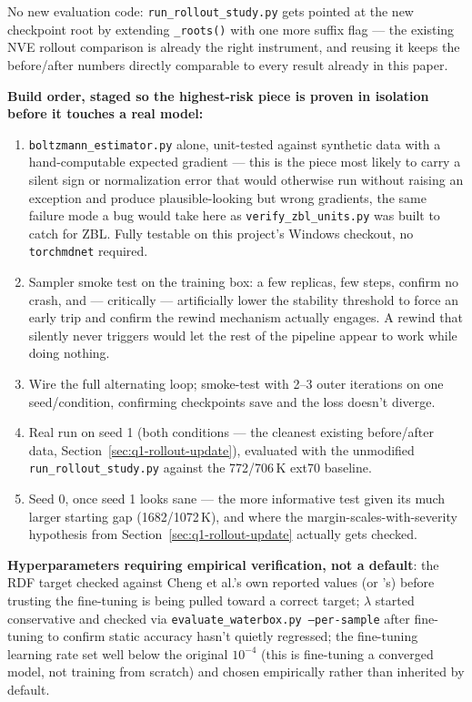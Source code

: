\documentclass[11pt]{article}
\begin{document}
No new evaluation code: \texttt{run\_rollout\_study.py} gets pointed at the
new checkpoint root by extending \texttt{\_roots()} with one more suffix
flag --- the existing NVE rollout comparison is already the right
instrument, and reusing it keeps the before/after numbers directly
comparable to every result already in this paper.

\textbf{Build order, staged so the highest-risk piece is proven in
isolation before it touches a real model:}
\begin{enumerate}
  \item \texttt{boltzmann\_estimator.py} alone, unit-tested against
  synthetic data with a hand-computable expected gradient --- this is the
  piece most likely to carry a silent sign or normalization error that
  would otherwise run without raising an exception and produce
  plausible-looking but wrong gradients, the same failure mode a bug would
  take here as \texttt{verify\_zbl\_units.py} was built to catch for ZBL.
  Fully testable on this project's Windows checkout, no \texttt{torchmdnet}
  required.
  \item Sampler smoke test on the training box: a few replicas, few steps,
  confirm no crash, and --- critically --- artificially lower the
  stability threshold to force an early trip and confirm the rewind
  mechanism actually engages. A rewind that silently never triggers would
  let the rest of the pipeline appear to work while doing nothing.
  \item Wire the full alternating loop; smoke-test with 2--3 outer
  iterations on one seed/condition, confirming checkpoints save and the
  loss doesn't diverge.
  \item Real run on seed 1 (both conditions --- the cleanest existing
  before/after data, Section~\ref{sec:q1-rollout-update}), evaluated with
  the unmodified \texttt{run\_rollout\_study.py} against the 772/706\,K
  ext70 baseline.
  \item Seed 0, once seed 1 looks sane --- the more informative test given
  its much larger starting gap (1682/1072\,K), and where the
  margin-scales-with-severity hypothesis from
  Section~\ref{sec:q1-rollout-update} actually gets checked.
\end{enumerate}

\textbf{Hyperparameters requiring empirical verification, not a default}:
the RDF target checked against Cheng et al.'s own reported values (or
\citet{thaler2021difftre}'s) before trusting the fine-tuning is being
pulled toward a correct target; $\lambda$ started conservative and checked
via \texttt{evaluate\_waterbox.py --per-sample} after fine-tuning to
confirm static accuracy hasn't quietly regressed; the fine-tuning learning
rate set well below the original $10^{-4}$ (this is fine-tuning a
converged model, not training from scratch) and chosen empirically rather
than inherited by default.
\end{document}
